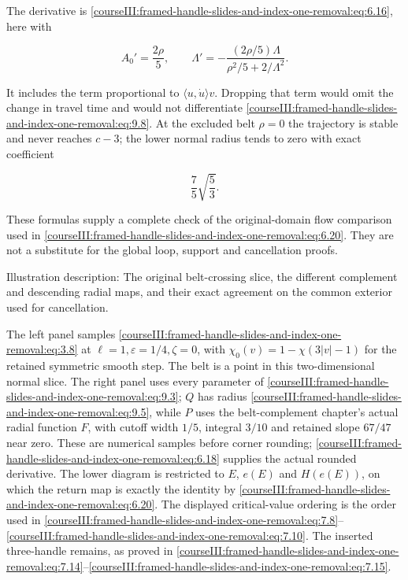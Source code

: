 The derivative is \eqref{courseIII:framed-handle-slides-and-index-one-removal:eq:6.16}, here with

\begin{equation}
A_0'=\frac{2\rho}{5},\qquad
 \Lambda'=-\frac{(2\rho/5)\Lambda}{\rho^2/5+2/\Lambda^2}.
 \label{courseIII:framed-handle-slides-and-index-one-removal:eq:9.10}
\end{equation}

It includes the term proportional to
\(\langle u,\dot u\rangle v\). Dropping that term would omit the change in travel time and would not differentiate \eqref{courseIII:framed-handle-slides-and-index-one-removal:eq:9.8}. At the excluded belt \(\rho=0\) the trajectory is stable and never reaches \(c-3\); the lower normal radius tends to zero with exact coefficient

\begin{equation}
\frac75\sqrt{\frac53}.
 \label{courseIII:framed-handle-slides-and-index-one-removal:eq:9.11}
\end{equation}

These formulas supply a complete check of the original-domain flow comparison used in \eqref{courseIII:framed-handle-slides-and-index-one-removal:eq:6.20}. They are not a substitute for the global loop, support and cancellation proofs.

Illustration description: The original belt-crossing slice, the different complement and descending radial maps, and their exact agreement on the common exterior used for cancellation.

The left panel samples \eqref{courseIII:framed-handle-slides-and-index-one-removal:eq:3.8} at \(\ell=1,\varepsilon=1/4,\zeta=0\), with \(\chi_0(v)=1-\chi(3|v|-1)\) for the retained symmetric smooth step. The belt is a point in this two-dimensional normal slice. The right panel uses every parameter of \eqref{courseIII:framed-handle-slides-and-index-one-removal:eq:9.3}; \(Q\) has radius \eqref{courseIII:framed-handle-slides-and-index-one-removal:eq:9.5}, while \(P\) uses the belt-complement chapter's actual radial function \(F\), with cutoff width \(1/5\), integral \(3/10\) and retained slope \(67/47\) near zero. These are numerical samples before corner rounding; \eqref{courseIII:framed-handle-slides-and-index-one-removal:eq:6.18} supplies the actual rounded derivative. The lower diagram is restricted to \(E\), \(e(E)\) and \(H(e(E))\), on which the return map is exactly the identity by \eqref{courseIII:framed-handle-slides-and-index-one-removal:eq:6.20}. The displayed critical-value ordering is the order used in \eqref{courseIII:framed-handle-slides-and-index-one-removal:eq:7.8}--\eqref{courseIII:framed-handle-slides-and-index-one-removal:eq:7.10}. The inserted three-handle remains, as proved in \eqref{courseIII:framed-handle-slides-and-index-one-removal:eq:7.14}--\eqref{courseIII:framed-handle-slides-and-index-one-removal:eq:7.15}.
